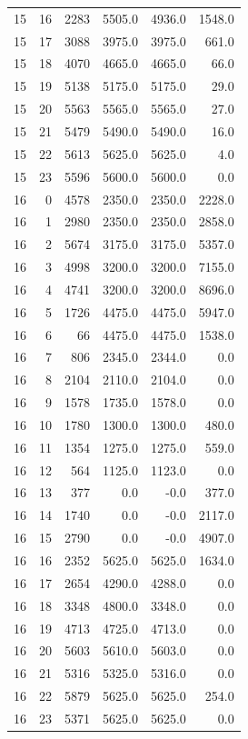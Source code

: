 \begin{longtable}{rrrrrr}
15 & 16 & 2283 & 5505.0 & 4936.0 & 1548.0\\
15 & 17 & 3088 & 3975.0 & 3975.0 & 661.0\\
15 & 18 & 4070 & 4665.0 & 4665.0 & 66.0\\
15 & 19 & 5138 & 5175.0 & 5175.0 & 29.0\\
15 & 20 & 5563 & 5565.0 & 5565.0 & 27.0\\
15 & 21 & 5479 & 5490.0 & 5490.0 & 16.0\\
15 & 22 & 5613 & 5625.0 & 5625.0 & 4.0\\
15 & 23 & 5596 & 5600.0 & 5600.0 & 0.0\\
16 & 0 & 4578 & 2350.0 & 2350.0 & 2228.0\\
16 & 1 & 2980 & 2350.0 & 2350.0 & 2858.0\\
16 & 2 & 5674 & 3175.0 & 3175.0 & 5357.0\\
16 & 3 & 4998 & 3200.0 & 3200.0 & 7155.0\\
16 & 4 & 4741 & 3200.0 & 3200.0 & 8696.0\\
16 & 5 & 1726 & 4475.0 & 4475.0 & 5947.0\\
16 & 6 & 66 & 4475.0 & 4475.0 & 1538.0\\
16 & 7 & 806 & 2345.0 & 2344.0 & 0.0\\
16 & 8 & 2104 & 2110.0 & 2104.0 & 0.0\\
16 & 9 & 1578 & 1735.0 & 1578.0 & 0.0\\
16 & 10 & 1780 & 1300.0 & 1300.0 & 480.0\\
16 & 11 & 1354 & 1275.0 & 1275.0 & 559.0\\
16 & 12 & 564 & 1125.0 & 1123.0 & 0.0\\
16 & 13 & 377 & 0.0 & -0.0 & 377.0\\
16 & 14 & 1740 & 0.0 & -0.0 & 2117.0\\
16 & 15 & 2790 & 0.0 & -0.0 & 4907.0\\
16 & 16 & 2352 & 5625.0 & 5625.0 & 1634.0\\
16 & 17 & 2654 & 4290.0 & 4288.0 & 0.0\\
16 & 18 & 3348 & 4800.0 & 3348.0 & 0.0\\
16 & 19 & 4713 & 4725.0 & 4713.0 & 0.0\\
16 & 20 & 5603 & 5610.0 & 5603.0 & 0.0\\
16 & 21 & 5316 & 5325.0 & 5316.0 & 0.0\\
16 & 22 & 5879 & 5625.0 & 5625.0 & 254.0\\
16 & 23 & 5371 & 5625.0 & 5625.0 & 0.0\\

\end{longtable}
